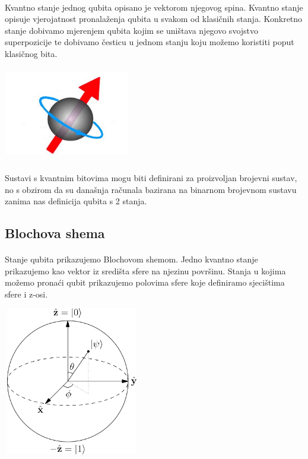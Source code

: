 \documentclass[times, utf8, zavrsni, numeric]{fer}
\begin{document}
\paragraph{}
Kvantno stanje jednog qubita opisano je vektorom njegovog spina. Kvantno stanje opisuje vjerojatnost pronalaženja qubita u svakom od klasičnih stanja. Konkretno stanje dobivamo mjerenjem qubita kojim se uništava njegovo svojstvo superpozicije te dobivamo česticu u jednom stanju koju možemo koristiti poput klasičnog bita.

\begin{center}
\includegraphics[width=55mm, height=40mm]{spin}
\end{center}

\paragraph{}
Sustavi s kvantnim bitovima mogu biti definirani za proizvoljan brojevni sustav, no s obzirom da su današnja računala bazirana na binarnom brojevnom sustavu zanima nas definicija qubita s 2 stanja.

\subsection{Blochova shema}
\paragraph{}
Stanje qubita prikazujemo Blochovom shemom. Jedno kvantno stanje prikazujemo kao vektor iz središta sfere na njezinu površinu. Stanja u kojima možemo pronaći qubit prikazujemo polovima sfere koje definiramo sjecištima sfere i z-osi. \citep{computer_scientist} \citep{qubit_geometry}

\begin{center}
\includegraphics[width=60mm, height=65mm]{bloch}
\end{center}
\end{document}
